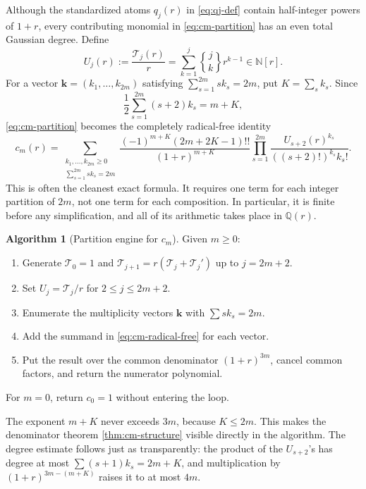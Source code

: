 \documentclass[11pt,a4paper]{article}
\theoremstyle{definition}
\newtheorem{algorithm}[theorem]{Algorithm}
\theoremstyle{remark}
\newcommand{\Tch}{\mathscr T}
\newcommand{\N}{\mathbb N}
\newcommand{\Q}{\mathbb Q}
\newcommand{\Stwo}[2]{\genfrac\{\}{0pt}{}{#1}{#2}}
\begin{document}
Although the standardized atoms \(q_j(r)\) in \cref{eq:qj-def} contain
half-integer powers of \(1+r\), every contributing monomial in
\cref{eq:cm-partition} has an even total Gaussian degree.  Define
\begin{equation}\label{eq:Uj-def}
 U_j(r):=\frac{\Tch_j(r)}{r}
        =\sum_{k=1}^{j}\Stwo{j}{k}r^{k-1}\in\N[r].
\end{equation}
For a vector \(\bm k=(k_1,\ldots,k_{2m})\) satisfying
\(\sum_{s=1}^{2m}s k_s=2m\), put \(K=\sum_s k_s\).  Since
\[
 \frac12\sum_{s=1}^{2m}(s+2)k_s=m+K,
\]
\cref{eq:cm-partition} becomes the completely radical-free identity
\begin{equation}\label{eq:cm-radical-free}
 \boxed{
 c_m(r)=
 \sum_{\substack{k_1,\ldots,k_{2m}\ge0\\
                   \sum_{s=1}^{2m}s k_s=2m}}
 \frac{(-1)^{m+K}(2m+2K-1)!!}{(1+r)^{m+K}}
 \prod_{s=1}^{2m}
 \frac{U_{s+2}(r)^{k_s}}{((s+2)!)^{k_s}k_s!}. }
\end{equation}
This is often the cleanest exact formula.  It requires one term for each
integer partition of \(2m\), not one term for each composition.  In
particular, it is finite before any simplification, and all of its arithmetic
takes place in \(\Q(r)\).

\begin{algorithm}[Partition engine for \(c_m\)]\label{alg:partition-engine}
Given \(m\ge0\):
\begin{enumerate}[label=\arabic*.,leftmargin=2.1em,itemsep=2pt]
 \item Generate \(\Tch_0=1\) and
       \(\Tch_{j+1}=r(\Tch_j+\Tch_j')\) up to \(j=2m+2\).
 \item Set \(U_j=\Tch_j/r\) for \(2\le j\le2m+2\).
 \item Enumerate the multiplicity vectors \(\bm k\) with
       \(\sum s k_s=2m\).
 \item Add the summand in \cref{eq:cm-radical-free} for each vector.
 \item Put the result over the common denominator \((1+r)^{3m}\), cancel
       common factors, and return the numerator polynomial.
\end{enumerate}
For \(m=0\), return \(c_0=1\) without entering the loop.
\end{algorithm}

The exponent \(m+K\) never exceeds \(3m\), because \(K\le2m\).  This makes the
denominator theorem \cref{thm:cm-structure} visible directly in the algorithm.
The degree estimate follows just as transparently: the product of the
\(U_{s+2}\)'s has degree at most
\(\sum(s+1)k_s=2m+K\), and multiplication by
\((1+r)^{3m-(m+K)}\) raises it to at most \(4m\).
\end{document}
